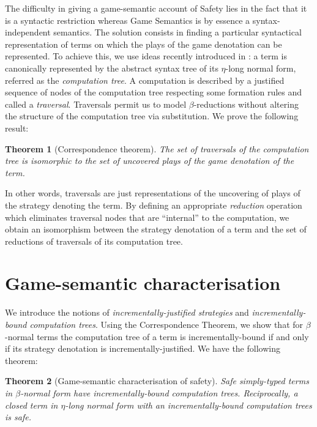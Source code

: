 \documentclass{ouclprgsc}
\newtheorem{thm}{Theorem}
\begin{document}
The difficulty in giving a game-semantic account of Safety lies in
the fact that it is a syntactic restriction whereas Game Semantics
is by essence a syntax-independent semantics. The solution consists
in finding a particular syntactical representation of terms on which
the plays of the game denotation can be represented.
 To achieve
this, we use ideas recently introduced in \cite{OngLics2006}: a term
is canonically represented by the abstract syntax tree of its
$\eta$-long normal form, referred as the \emph{computation tree}. A
computation is described by a justified sequence of nodes of the
computation tree respecting some formation rules and called a
\emph{traversal}. Traversals permit us to model $\beta$-reductions
without altering the structure of the computation tree via
substitution.
%
%
We prove the following result:
\begin{thm}[Correspondence theorem]
\label{thm:corresp} The set of traversals of the computation tree is
isomorphic to the set of uncovered plays of the game denotation of
the term.
\end{thm}

In other words, traversals are just representations of the
uncovering of plays of the strategy denoting the term. By defining
an appropriate \emph{reduction} operation which eliminates traversal
nodes that are ``internal'' to the computation, we obtain an
isomorphism between the strategy denotation of a term and the set of
reductions of traversals of its computation tree.

\section{Game-semantic characterisation}

We introduce the notions of \emph{incrementally-justified
strategies} and \emph{incrementally-bound computation trees}. Using
the Correspondence Theorem, we show that for $\beta$-normal terms
the computation tree of a term is incrementally-bound if and only if
its strategy denotation is incrementally-justified. We have the
following theorem:

\begin{thm}[Game-semantic characterisation of safety]
\label{thm:gamesem_charact} Safe simply-typed terms in
$\beta$-normal form have incrementally-bound computation trees.
Reciprocally, a closed term in $\eta$-long normal form with an
incrementally-bound computation trees is safe.
\end{thm}
\end{document}
